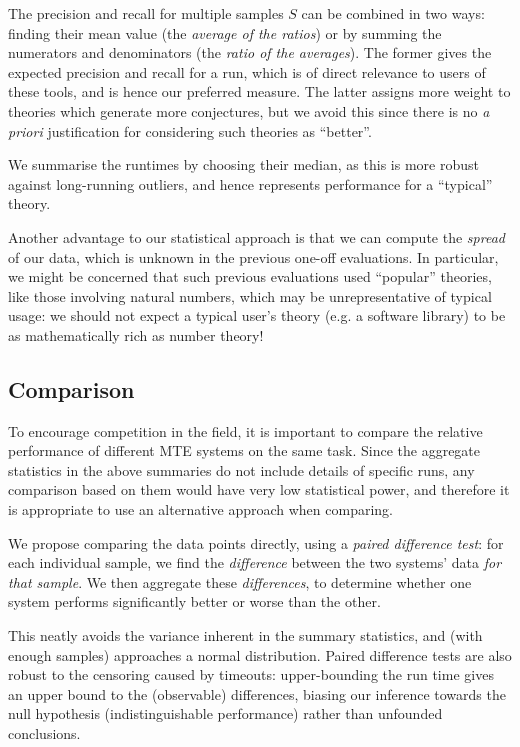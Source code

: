 The precision and recall for multiple samples $S$ can be combined in two ways:
finding their mean value (the \emph{average of the ratios}) or by summing the
numerators and denominators (the \emph{ratio of the averages}). The former gives
the expected precision and recall for a run, which is of direct relevance to
users of these tools, and is hence our preferred measure. The latter assigns
more weight to theories which generate more conjectures, but we avoid this since
there is no \emph{a priori} justification for considering such theories as
``better''.

We summarise the runtimes by choosing their median, as this is more robust
against long-running outliers, and hence represents performance for a
``typical'' theory.

Another advantage to our statistical approach is that we can compute the
\emph{spread} of our data, which is unknown in the previous one-off
evaluations. In particular, we might be concerned that such previous evaluations
used ``popular'' theories, like those involving natural numbers, which may be
unrepresentative of typical usage: we should not expect a typical user's theory
(e.g. a software library) to be as mathematically rich as number theory!

\subsection{Comparison}

To encourage competition in the field, it is important to compare the relative
performance of different MTE systems on the same task. Since the aggregate
statistics in the above summaries do not include details of specific runs, any
comparison based on them would have very low statistical power, and therefore it
is appropriate to use an alternative approach when comparing.

We propose comparing the data points directly, using a \emph{paired difference
  test}: for each individual sample, we find the \emph{difference} between the
two systems' data \emph{for that sample}. We then aggregate these
\emph{differences}, to determine whether one system performs significantly
better or worse than the other.

This neatly avoids the variance inherent in the summary statistics, and (with
enough samples) approaches a normal distribution. Paired difference tests are
also robust to the censoring caused by timeouts: upper-bounding the run time
gives an upper bound to the (observable) differences, biasing our inference
towards the null hypothesis (indistinguishable performance) rather than
unfounded conclusions.

